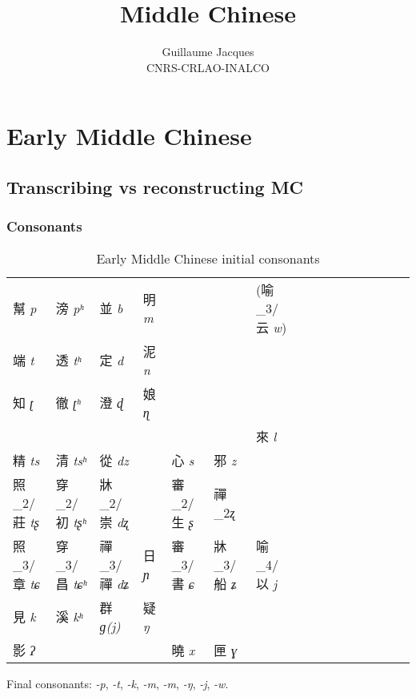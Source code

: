 \documentclass[oneside,a4paper,11pt]{article}
\newcommand{\ipa}[1]{{\phon\textit{#1}}}
\newcommand{\zh}[1]{{\cn #1}}
\newcommand{\zhc}[2]{\zh{#1} \ipa{#2}}
\begin{document}
 
\title{Middle Chinese}
\author{Guillaume Jacques\\ CNRS-CRLAO-INALCO}
\maketitle

\section{Early Middle Chinese}

\subsection{Transcribing vs reconstructing MC}
\subsubsection{Consonants}
\begin{table}[H]
\caption{Early Middle Chinese initial consonants} \label{tab:mc.onset}
\begin{tabular}{llllllllllllllll}
\toprule
 	\zhc{幫}{p} & 	\zhc{滂}{pʰ} & 	\zhc{並}{b} & 	\zhc{明}{m} & 	 & 	 & (\zh{喻}_3/\zhc{云}{w})	 & 	\\
  	\zhc{端}{t} & 	\zhc{透}{tʰ} & 	\zhc{定}{d} & 	\zhc{泥}{n} & 	 & 	 & 	 & 	\\
 	\zhc{知}{ʈ} & 	\zhc{徹}{ʈʰ} & 	\zhc{澄}{ɖ} & 	\zhc{娘}{ɳ} & 	 & 	 & 	 & 	\\
  	 & 	 & 	 & 	 & 	 & 	 & 	\zhc{來}{l} & 	\\
  	\zhc{精}{ts} & 	\zhc{清}{tsʰ} & 	\zhc{從}{dz} & 	 & 	\zhc{心}{s} & 	\zhc{邪}{z} & 	 & 	\\
  	\zh{照}_2/\zhc{莊}{tʂ} & 	\zh{穿}_2/\zhc{初}{tʂʰ} & 	\zh{牀}_2/\zhc{崇}{dʐ} & 	 & 	  	\zh{審}_2/\zhc{生}{ʂ} & 	 \zh{禪}_2\ipa{ʐ} & 	 & 	\\
 	  	\zh{照}_3/\zhc{章}{tɕ} & 	\zh{穿}_3/\zhc{昌}{tɕʰ} & 	\zh{禪}_3/\zhc{禪}{dʑ} & 	\zhc{日}{ɲ} & 	\zh{審}_3/\zhc{書}{ɕ} & 	\zh{牀}_3/\zhc{船}{ʑ} & 	\zh{喻}_4/\zhc{以}{j} & 	\\
 	\zhc{見}{k} & 	\zhc{溪}{kʰ} & 	\zhc{群}{ɡ(j)} & 	\zhc{疑}{ŋ} & 	 & 	 & 	 & 	\\
 	\zhc{影}{ʔ} & 	 & 	 & 	 & 	\zhc{曉}{x} & 	\zhc{匣}{ɣ} & 	 & 	\\
\bottomrule
\end{tabular}
\end{table}

Final consonants: \ipa{-p},  \ipa{-t},  \ipa{-k},  \ipa{-m},  \ipa{-m},  \ipa{-ŋ}, \ipa{-j}, \ipa{-w}.
\end{document}
